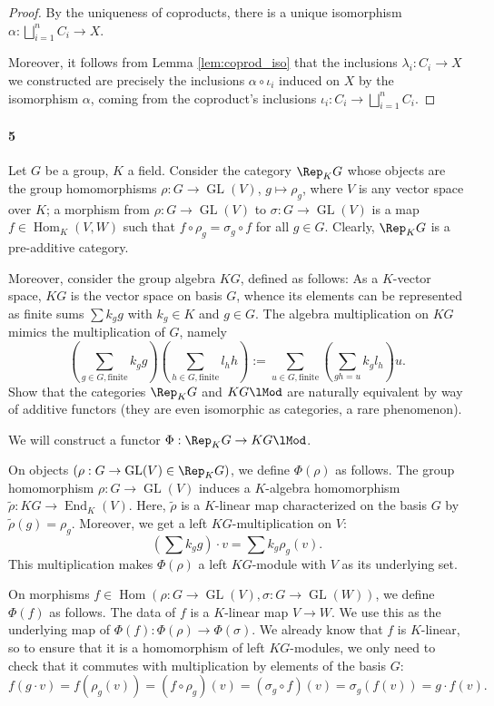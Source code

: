 \documentclass[12pt]{article}
\newlength{\myparskip}
\newenvironment{fullbox}{\begin{lrbox}{\savefullbox}\begin{minipage}{\dimexpr\textwidth-2\fboxsep\relax}\setlength{\parskip}{\myparskip}}{\end{minipage}\end{lrbox}\framebox[\textwidth]{\usebox{\savefullbox}}}
\newenvironment{pbox}[1][]{\begin{fullbox}\def\temp{#1}\ifx\temp\empty\else\paragraph{#1}\phantom{}\fi}{\end{fullbox}}
\theoremstyle{definition}
\newcommand{\<}{\langle}
\renewcommand{\>}{\rangle}
\renewcommand{\tilde}{\widetilde}
\renewcommand{\_}[1]{{_{#1}}}
\DeclareMathOperator{\Hom}{Hom}
\DeclareMathOperator{\GL}{GL}
\begin{document}
\begin{proof}
    By the uniqueness of coproducts, there is a unique isomorphism $\alpha : \bigsqcup_{i=1}^{n} C_i \to X$.

    Moreover, it follows from Lemma \ref{lem:coprod_iso} that the inclusions $\lambda_i : C_i \to X$ we constructed are precisely the inclusions $\alpha \circ \iota_i$ induced on $X$ by the isomorphism $\alpha$, coming from the coproduct's inclusions $\iota_i : C_i \to \bigsqcup_{i=1}^{n} C_i$.
\end{proof}

\newpage
\begin{pbox}[5]
    Let $G$ be a group, $K$ a field. Consider the category $\Rep_KG$ whose objects are the group homomorphisms $\rho : G \to \GL(V)$, $g \mapsto \rho_g$, where $V$ is any vector space over $K$; a morphism from $\rho : G \to \GL(V)$ to $\sigma : G\to \GL(V)$ is a map $f \in \Hom_K(V, W)$ such that $f\circ \rho_g = \sigma_g \circ f$ for all $g \in G$. Clearly, $\Rep_K G$ is a pre-additive category.
    
    Moreover, consider the group algebra $KG$, defined as follows: As a $K$-vector space, $KG$ is the vector space on basis $G$, whence its elements can be represented as finite sums $\sum k_g g$ with $k_g \in K$ and $g \in G$. The algebra multiplication on $KG$ mimics the multiplication of $G$, namely
    \[
        \left(\sum_{g\in G, \text{finite}} k_g g\right)\left(\sum_{h\in G, \text{finite}} l_h h\right)
            := \sum_{u\in G, \text{finite}} \left(\sum_{gh=u} k_g l_h\right) u.
    \]
    Show that the categories $\Rep_KG$ and $KG\lMod$ are naturally equivalent by way of additive functors (they are even isomorphic as categories, a rare phenomenon).
\end{pbox}

We will construct a functor $\Phi : \Rep_KG \to KG\lMod$.

On objects $(\rho : G \to \GL(V) \in \Rep_KG)$, we define $\Phi(\rho)$ as follows.
The group homomorphism $\rho : G \to \GL(V)$ induces a $K$-algebra homomorphism $\tilde{\rho} : KG \to \operatorname{End}_K(V)$.
Here, $\tilde{\rho}$ is a $K$-linear map characterized on the basis $G$ by $\tilde{\rho}(g) = \rho_g$.
Moreover, we get a left $KG$-multiplication on $V$:
\[\textstyle
    (\sum k_g g) \cdot v
        = \sum k_g \rho_g(v).
\]
This multiplication makes $\Phi(\rho)$ a left $KG$-module with $V$ as its underlying set.

On morphisms $f \in \Hom(\rho : G \to \GL(V), \sigma : G \to \GL(W))$, we define $\Phi(f)$ as follows.
The data of $f$ is a $K$-linear map $V \to W$.
We use this as the underlying map of $\Phi(f) : \Phi(\rho) \to \Phi(\sigma)$.
We already know that $f$ is $K$-linear, so to ensure that it is a homomorphism of left $KG$-modules, we only need to check that it commutes with multiplication by elements of the basis $G$:
\[
    f(g \cdot v)
        = f(\rho_g(v))
        = (f \circ \rho_g)(v)
        = (\sigma_g \circ f)(v)
        = \sigma_g(f(v))
        = g \cdot f(v).
\]
\end{document}
